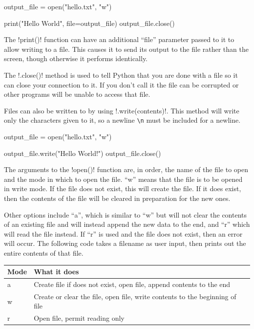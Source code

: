 \documentclass[11pt]{cselabheader}
\begin{document}
\begin{python3code}
output_file = open("hello.txt", "w")

print("Hello World", file=output_file)
output_file.close()
\end{python3code}

The \pythoninline!print()! function can have an additional ``file'' parameter
passed to it to allow writing to a file. This causes it to send its output to
the file rather than the screen, though otherwise it performs identically.

The \pythoninline!.close()! method is used to tell Python that you are done
with a file so it can close your connection to it. If you don't call it
the file can be corrupted or other programs will be unable to access that
file.

Files can also be written to by using \pythoninline!.write(contents)!. This
method will write only the characters given to it, so a newline \lstinline{\n}
must be included for a newline.

\begin{python3code}
output_file = open("hello.txt", "w")

output_file.write("Hello World\nGoodbye!\n")
output_file.close()
\end{python3code}

The arguments to the \pythoninline!open()! function are, in order, the name of
the file to open and the mode in which to open the file. ``w'' means that the
file is to be opened in write mode. If the file does not exist, this will create
the file. If it does exist, then the contents of the file will be cleared in
preparation for the new ones.

Other options include ``a'', which is similar to ``w'' but will not clear the
contents of an existing file and will instead append the new data to the end,
and ``r'' which will read the file instead. If ``r'' is used and the file does
not exist, then an error will occur. The following code takes a filename as user
input, then prints out the entire contents of that file.

\begin{center}
  \begin{tabular}{ll}
    Mode & What it does \\
    \midrule
    a & Create file if does not exist, open file, append contents to the end \\
    w & Create or clear the file, open file, write contents to the beginning of
    file \\
    r & Open file, permit reading only \\
  \end{tabular}
\end{center}
\end{document}
